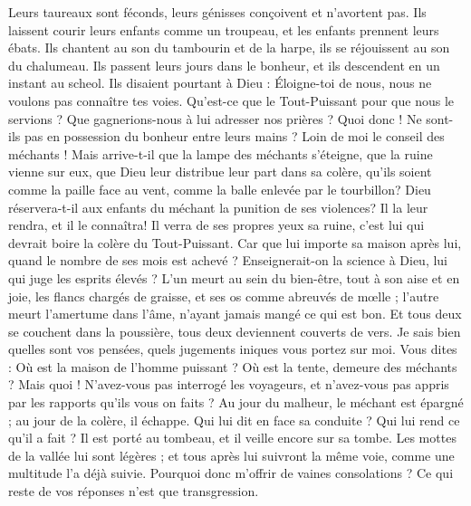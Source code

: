 \begin{multicols}{2}
Leurs taureaux sont féconds, leurs génisses conçoivent et n'avortent pas.
Ils laissent courir leurs enfants comme un troupeau, et les enfants prennent leurs ébats.
Ils chantent au son du tambourin et de la harpe, ils se réjouissent au son du chalumeau.
Ils passent leurs jours dans le bonheur, et ils descendent en un instant au scheol.
Ils disaient pourtant à Dieu : Éloigne-toi de nous, nous ne voulons pas connaître tes voies.
Qu'est-ce que le Tout-Puissant pour que nous le servions ? Que gagnerions-nous à lui adresser nos prières ?
Quoi donc ! Ne sont-ils pas en possession du bonheur entre leurs mains ? Loin de moi le conseil des méchants !
Mais arrive-t-il que la lampe des méchants s'éteigne, que la ruine vienne sur eux, que Dieu leur distribue leur part dans sa colère,
qu'ils soient comme la paille face au vent, comme la balle enlevée par le tourbillon?
Dieu réservera-t-il aux enfants du méchant la punition de ses violences? Il la leur rendra, et il le connaîtra!
Il verra de ses propres yeux sa ruine, c'est lui qui devrait boire la colère du Tout-Puissant.
Car que lui importe sa maison après lui, quand le nombre de ses mois est achevé ?
Enseignerait-on la science à Dieu, lui qui juge les esprits élevés ?
L'un meurt au sein du bien-être, tout à son aise et en joie,
les flancs chargés de graisse, et ses os comme abreuvés de mœlle ;
l'autre meurt l'amertume dans l'âme, n'ayant jamais mangé ce qui est bon.
Et tous deux se couchent dans la poussière, tous deux deviennent couverts de vers.
Je sais bien quelles sont vos pensées, quels jugements iniques vous portez sur moi.
Vous dites : Où est la maison de l'homme puissant ? Où est la tente, demeure des méchants ?
Mais quoi ! N'avez-vous pas interrogé les voyageurs, et n'avez-vous pas appris par les rapports qu'ils vous on faits ?
Au jour du malheur, le méchant est épargné ; au jour de la colère, il échappe.
Qui lui dit en face sa conduite ? Qui lui rend ce qu'il a fait ?
Il est porté au tombeau, et il veille encore sur sa tombe.
Les mottes de la vallée lui sont légères ; et tous après lui suivront la même voie, comme une multitude l'a déjà suivie.
Pourquoi donc m'offrir de vaines consolations ? Ce qui reste de vos réponses n'est que transgression.

\end{multicols}
